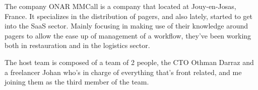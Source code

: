 The company ONAR MMCall is a company that located at Jouy-en-Josas, France.
It specializes in the distribution of pagers, and also lately, started to get into the SaaS sector.
Mainly focusing in making use of their knowledge around pagers to allow the ease up of management of a workflow,
they've been working both in restauration and in the logistics sector.

The host team is composed of a team of 2 people, the CTO Othman Darraz and a freelancer Johan who's in charge
of everything that's front related, and me joining them as the third member of the team.
